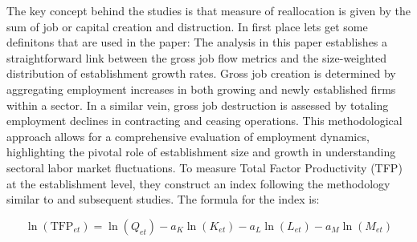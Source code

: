 \documentclass[12pt]{article}
\begin{document}
The key concept behind the \cite{DAvHalt90,DavHalt92} studies is that measure of reallocation is given by the sum of job
or capital creation and distruction. In first place lets get some definitons that are used in the paper:
The analysis in this paper establishes a straightforward link between the gross job flow metrics and the size-weighted
distribution of establishment growth rates. Gross job creation is determined by aggregating employment increases in both
growing and newly established firms within a sector. In a similar vein, gross job destruction is assessed by totaling
employment declines in contracting and ceasing operations. This methodological approach allows for a comprehensive
evaluation of employment dynamics, highlighting the pivotal role of establishment size and growth in understanding
sectoral labor market fluctuations. 
To measure Total Factor Productivity (TFP) at the establishment level, they construct an index following the methodology
similar to \cite{baily1992productivity} and subsequent studies. The formula for the index is:  

\[ \ln(\text{TFP}_{et}) = \ln(Q_{et}) - a_K\ln(K_{et}) - a_L\ln(L_{et}) - a_M\ln(M_{et}) \]
\end{document}
